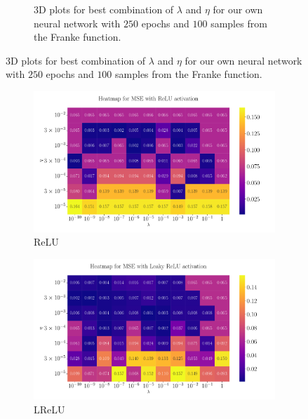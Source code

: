 \documentclass[%
reprint,s
amsmath,amssymb,
aps,
]{revtex4-2}
\begin{document}
\begin{figure}[ht!]
\begin{subfigure}[b]{0.43\textwidth}
		\caption{3D plots for best combination of $\lambda$ and $\eta$ for our own neural network with $250$ epochs and $100$ samples from the Franke function.}
		\label{fig:NN_noKeras_3D_Franke_Epochs250}
	\end{subfigure}
\end{figure}

\begin{figure}[ht!]
	\begin{subfigure}{0.41\textwidth}
		\includegraphics[width=\textwidth]{Figures/Heatmap_MSE_ReLU_Franke_Epochs250.pdf}
		\caption{ReLU}
	\end{subfigure}
	\hfill
	\begin{subfigure}{0.41\textwidth}
		\includegraphics[width=\textwidth]{Figures/Heatmap_MSE_Leaky ReLU_Franke_Epochs250.pdf}
		\caption{LReLU}
	\end{subfigure}
	\hfill\newline
	\begin{subfigure}{0.41\textwidth}

\end{subfigure}
\end{figure}
\end{document}
